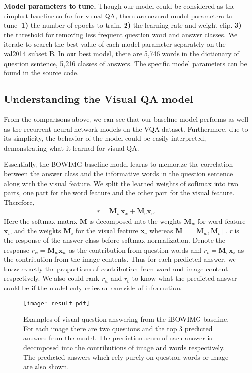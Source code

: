 \documentclass{article} \usepackage{nips14submit_e,times}
\begin{document}
\textbf{Model parameters to tune.} Though our model could be considered as the simplest baseline so far for visual QA, there are several model parameters to tune: \textbf{1)} the number of epochs to train. \textbf{2)} the learning rate and weight clip. \textbf{3)} the threshold for removing less frequent question word and answer classes. We iterate to search the best value of each model parameter separately on the val2014 subset B. In our best model, there are 5,746 words in the dictionary of question sentence, 5,216 classes of answers. The specific model parameters can be found in the source code.




\subsection{Understanding the Visual QA model}

From the comparisons above, we can see that our baseline model performs as well as the recurrent neural network models on the VQA dataset. Furthermore, due to its simplicity, the behavior of the model could be easily interpreted, demonstrating what it learned for visual QA. 

Essentially, the BOWIMG baseline model learns to memorize the correlation between the answer class and the informative words in the question sentence along with the visual feature. We split the learned weights of softmax into two parts, one part for the word feature and the other part for the visual feature. Therefore, 
\begin{align}\label{eq:linearscore}
r = \textbf{M}_{w}\textbf{x}_{w} + \textbf{M}_{v}\textbf{x}_{v}.
\end{align}
Here the softmax matrix $\textbf{M}$ is decomposed into the weights $\textbf{M}_w$ for word feature $\textbf{x}_{w}$ and the weights $\textbf{M}_v$ for the visual feature $\textbf{x}_{v}$ whereas $\textbf{M} = [\textbf{M}_w,\textbf{M}_v]$. $r$ is the response of the answer class before softmax normalization. Denote the response $r_w = \textbf{M}_{w}\textbf{x}_{w}$ as the contribution from question words and $r_v = \textbf{M}_{v}\textbf{x}_{v}$ as the contribution from the image contents. Thus for each predicted answer, we know exactly the proportions of contribution from word and image content respectively. We also could rank $r_w$ and $r_v$ to know what the predicted answer could be if the model only relies on one side of information. 

\begin{figure}
\begin{center}
\texttt{[image: result.pdf]}
\end{center}
\caption{Examples of visual question answering from the iBOWIMG baseline. For each image there are two questions and the top 3 predicted answers from the model. The prediction score of each answer is decomposed into the contributions of image and words respectively. The predicted answers which rely purely on question words or image are also shown.}\label{vqa_prediction}
\end{figure}
\end{document}
